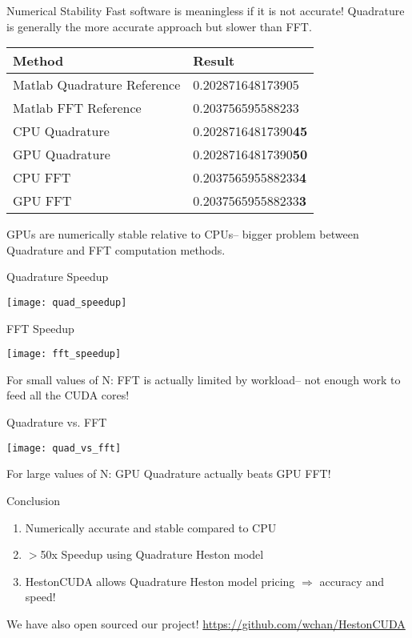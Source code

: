 \documentclass{beamer}
\begin{document}
\begin{frame}[t]{Numerical Stability}
Fast software is meaningless if it is not accurate!
Quadrature is generally the more accurate approach but slower than FFT.
\begin{table}
\centering
\begin{tabular}{|l|l|}
\hline
\bfseries Method & \bfseries Result \\
\hline\hline
Matlab Quadrature Reference  & 0.202871648173905 \\
Matlab FFT Reference         & 0.203756595588233 \\
\hline
\hline
CPU Quadrature     & 0.20287164817390\textbf{45} \\
GPU Quadrature     & 0.20287164817390\textbf{50} \\
\hline
\hline
CPU FFT            & 0.203756595588233\textbf{4} \\
GPU FFT            & 0.203756595588233\textbf{3} \\
\hline
\end{tabular}
\end{table}
\vfill
GPUs are numerically stable relative to CPUs-- bigger problem between Quadrature and FFT computation methods.
\end{frame}

\begin{frame}[t]{Quadrature Speedup}
\begin{center}
\texttt{[image: quad\_speedup]}
\end{center}
\end{frame}

\begin{frame}[t]{FFT Speedup}
\begin{center}
\texttt{[image: fft\_speedup]}
\end{center}
For small values of N: FFT is actually limited by workload-- not enough work to feed all the CUDA cores!
\end{frame}

\begin{frame}[t]{Quadrature vs. FFT}
\begin{center}
\texttt{[image: quad\_vs\_fft]}
\end{center}
For large values of N: GPU Quadrature actually beats GPU FFT!
\end{frame}

\begin{frame}[t]{Conclusion}
\begin{enumerate}
\item Numerically accurate and stable compared to CPU
\item $>$50x Speedup using Quadrature Heston model
\item HestonCUDA allows Quadrature Heston model pricing $\Rightarrow$ accuracy and speed!
\end{enumerate}
\vfill
We have also open sourced our project! \url{https://github.com/wchan/HestonCUDA}
\end{frame}
\end{document}
